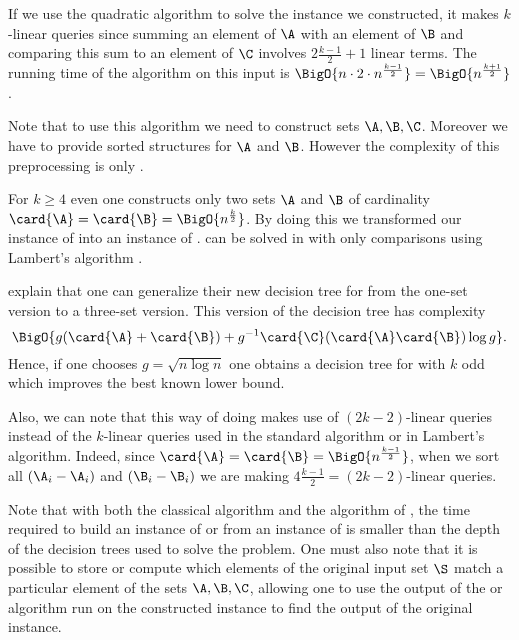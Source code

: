 If we use the quadratic \threeSUM algorithm to solve the instance we
constructed, it makes \(k\)-linear queries since summing an element of
\(\A\) with an element of \(\B\) and comparing this sum to an element of
\(\C\) involves \(2 \frac{k-1}{2} + 1\) linear terms. The running time of
the \threeSUM algorithm on this input is \(\BigO{n \cdot 2 \cdot n^{\frac{k-1}{2}}} =
\BigO{n^{\frac{k+1}{2}}}\).

Note that to use this algorithm we need to construct sets \(\A,\B,\C\).
Moreover we have to provide sorted structures for \(\A\) and \(\B\). However
the complexity of this preprocessing is only .

For \(k \ge 4\) even one constructs only two sets \(\A\) and \(\B\) of
cardinality \(\card{\A} = \card{\B} = \BigO{n^{\frac{k}{2}}}\). By doing this
we transformed our instance of \kLDT into an instance of \twoSUM. \twoSUM can be
solved in  with only 
comparisons using Lambert's algorithm \cite{lambert:1990}.

\citet*{gronlund:2014} explain that one can generalize their new decision tree
for \threeSUM from the one-set version to a three-set version. This version of
the decision tree has complexity
\begin{displaymath}
\BigO{g(\card{\A}+\card{\B}) + g^{-1}\card{\C}(\card{\A}\card{\B})\log g}.
\end{displaymath}
Hence, if one chooses \(g = \sqrt{n \log n}\) one obtains a
 decision tree for \kLDT with $k$ odd
which improves the best known lower bound.

Also, we can note that this way of doing makes use of \((2k-2)\)-linear queries
instead of the \(k\)-linear queries used in the standard \threeSUM
algorithm or in Lambert's algorithm. Indeed, since \(\card{\A} = \card{\B} =
\BigO{n^{\frac{k-1}{2}}}\), when we sort all \((\A_i - \A_i)\) and \((\B_i -
\B_i)\) we are making \(4 \frac{k-1}{2} = (2k-2)\)-linear queries.

Note that with both the classical algorithm and the algorithm of
\citet*{gronlund:2014}, the time required to build an instance of \twoSUM or
\threeSUM from an instance of \kLDT is smaller than the depth of the decision
trees used to solve the problem. One must also note that it is possible to
store or compute which elements of the original input set \(\S\) match a
particular element of the sets \(\A,\B,\C\), allowing one to use the output of
the \twoSUM or \threeSUM algorithm run on the constructed instance to find the
output of the original \kLDT instance.


